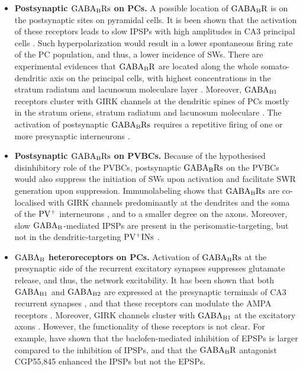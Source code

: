     \begin{itemize}
      \item \textbf{Postsynaptic $\rm GABA_BRs$ on PCs.}
        A possible location of $\rm GABA_BR$ is on the postsynaptic sites on
        pyramidal cells. It is been shown that the activation of these
        receptors leads to slow IPSPs with high amplitudes in CA3 principal
        cells \citep{Knowles1984}. Such hyperpolarization would result in a
        lower spontaneous firing rate of the PC population, and thus, a lower
        incidence of SWs. There are experimental evidences that $\rm GABA_BR$
        are located along the whole somato-dendritic axis on the principal
        cells, with highest concentrations in the stratum radiatum and
        lacunosum moleculare layer \citep{Degro2015}. Moreover, $\rm GABA_{B1}$
        receptors cluster with GIRK channels at the dendritic spines of PCs
        mostly in the stratum oriens, stratum radiatum and lacunosum moleculare
        \citep{Kulik2006}. The activation of postsynaptic $\rm GABA_BRs$
        requires a repetitive firing of one or more presynaptic interneurons
        \citep{Scanziani2000}.

      \item \textbf{Postsynaptic $\rm GABA_BRs$ on PVBCs.}
        Because of the hypothesised disinhibitory role of the PVBCs, 
        postsynaptic $\rm GABA_BRs$ on the PVBCs would also suppress the
        initiation of SWs upon activation and facilitate SWR generation upon
        suppression. Immunolabeling shows that $\rm GABA_BRs$ are co-localised
        with GIRK channels predominantly at the dendrites and the soma of the
        $\rm PV^+$ interneurons \citep{Booker2013}, and to a smaller degree on
        the axons. Moreover, slow $\rm GABA_B$-mediated IPSPs are present in
        the perisomatic-targeting, but not in the dendritic-targeting $\rm
        PV^+INs$ \citep{Booker2013}.

      \item \textbf{$\rm GABA_B$ heteroreceptors on PCs.}
        Activation of $\rm GABA_BRs$ at the presynaptic side of the recurrent
        excitatory synapses suppresses glutamate release, and thus, the network
        excitability. It has been shown that both $\rm GABA_{B1}$ and $\rm
        GABA_{B2}$ are expressed at the presynaptic terminals of CA3 recurrent
        synapses \citep{Lopez2004}, and that these receptors can modulate the
        AMPA receptors \citep{Lei2003}. Moreover, GIRK channels cluster with
        $\rm GABA_{B1}$ at the excitatory axons \citep{Kulik2006}. However, the
        functionality of these receptors is not clear. For example,
        \cite{Lei2003} have shown that the baclofen-mediated inhibition of
        EPSPs is larger compared to the inhibition of IPSPs, and that the $\rm
        GABA_{B}R$ antagonist CGP55,845 enhanced the IPSPs but not the EPSPs.


\end{itemize}
